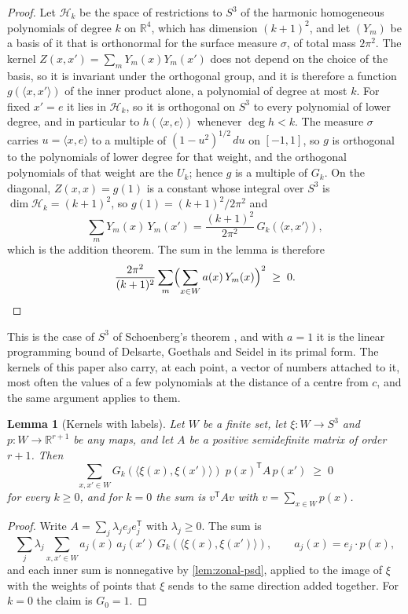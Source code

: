 \documentclass[11pt,reqno]{amsart}
\renewcommand{\_}{\origunderscore\allowbreak}
\numberwithin{equation}{section}
\theoremstyle{plain}
\newtheorem{lem}[thm]{Lemma}
\theoremstyle{definition}
\theoremstyle{remark}
\begin{document}
\begin{proof}
Let $\mathcal H_k$ be the space of restrictions to $S^3$ of the harmonic
homogeneous polynomials of degree $k$ on $\mathbb{R}^4$, which has
dimension $(k+1)^2$, and let $(Y_m)$ be a basis of it that is orthonormal
for the surface measure $\sigma$, of total mass $2\pi^2$. The kernel
$Z(x,x')=\sum_mY_m(x)Y_m(x')$ does not depend on the choice of the basis,
so it is invariant under the orthogonal group, and it is therefore a
function $g(\langle x,x'\rangle)$ of the inner product alone, a
polynomial of degree at most $k$. For fixed $x'=e$ it lies in
$\mathcal H_k$, so it is orthogonal on $S^3$ to every polynomial of lower
degree, and in particular to $h(\langle x,e\rangle)$ whenever
$\deg h<k$. The measure $\sigma$ carries $u=\langle x,e\rangle$ to a
multiple of $(1-u^2)^{1/2}\,du$ on $[-1,1]$, so $g$ is orthogonal to the
polynomials of lower degree for that weight, and the orthogonal
polynomials of that weight are the $U_k$; hence $g$ is a multiple of
$G_k$. On the diagonal, $Z(x,x)=g(1)$ is a constant whose integral over
$S^3$ is $\dim\mathcal H_k=(k+1)^2$, so $g(1)=(k+1)^2/2\pi^2$ and
\[
  \sum_mY_m(x)\,Y_m(x')=\frac{(k+1)^2}{2\pi^2}\,G_k(\langle x,x'\rangle),
\]
which is the addition theorem. The sum in the lemma is therefore
\[
  \frac{2\pi^2}{(k+1)^2}\sum_m\Bigl(\sum_{x\in W}a(x)\,Y_m(x)\Bigr)^2\;\ge\;0 .\qedhere
\]
\end{proof}

This is the case of $S^3$ of Schoenberg's theorem \cite{Sch42}, and with
$a=1$ it is the linear programming bound of Delsarte, Goethals and Seidel
\cite{DGS77} in its primal form. The kernels of this paper also carry, at
each point, a vector of numbers attached to it, most often the values of
a few polynomials at the distance of a centre from $c$, and the same
argument applies to them.

\begin{lem}[Kernels with labels]\label{lem:labelled-psd}
Let $W$ be a finite set, let $\xi\colon W\to S^3$ and
$p\colon W\to\mathbb{R}^{r+1}$ be any maps, and let $A$ be a positive
semidefinite matrix of order $r+1$. Then
\[
  \sum_{x,x'\in W}G_k(\langle\xi(x),\xi(x')\rangle)\;p(x)^{\mathsf T}A\,p(x')\;\ge\;0
\]
for every $k\ge0$, and for $k=0$ the sum is $v^{\mathsf T}Av$ with
$v=\sum_{x\in W}p(x)$.
\end{lem}

\begin{proof}
Write $A=\sum_j\lambda_je_je_j^{\mathsf T}$ with $\lambda_j\ge0$. The sum
is
\[
  \sum_j\lambda_j\sum_{x,x'\in W}a_j(x)\,a_j(x')\,G_k(\langle\xi(x),\xi(x')\rangle),
  \qquad a_j(x)=e_j\cdot p(x),
\]
and each inner sum is nonnegative by
\cref{lem:zonal-psd}, applied to the image of $\xi$ with the weights of
points that $\xi$ sends to the same direction added together. For $k=0$
the claim is $G_0=1$.
\end{proof}
\end{document}
